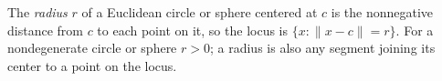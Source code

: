 
The \emph{radius} $r$ of a Euclidean circle or sphere centered at $c$ is the nonnegative distance from $c$ to each point on it, so the locus is $\{x:\|x-c\|=r\}$. For a nondegenerate circle or sphere $r>0$; a radius is also any segment joining its center to a point on the locus.
